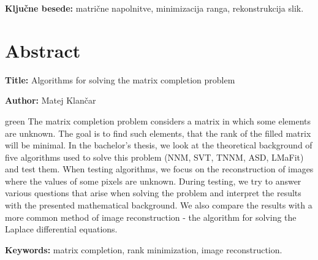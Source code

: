 \documentclass[a4paper,12pt,openright]{book}
\newcommand{\ttitleEn}{Algorithms for solving the matrix completion problem}
\newcommand{\tauthor}{Matej Klančar}
\newcommand{\tkeywords}{matrične napolnitve, minimizacija ranga, rekonstrukcija slik}
\newcommand{\tkeywordsEn}{matrix completion, rank minimization, image reconstruction}
\newcommand{\clearemptydoublepage}{\newpage{\pagestyle{empty}\cleardoublepage}}
\newcommand{\CG}[1]{\begin{color}{green}#1\end{color}}
\begin{document}
\bigskip

\noindent\textbf{Ključne besede:} \tkeywords.
\clearemptydoublepage

{}
\chapter*{Abstract}

\noindent\textbf{Title:} \ttitleEn
\bigskip

\noindent\textbf{Author:} \tauthor
\bigskip

\noindent \CG{
    The matrix completion problem considers a matrix in which some elements are unknown. The goal is to find such elements, that the rank of the filled matrix will be minimal. In the bachelor's thesis, we look at the theoretical background of five algorithms used to solve this problem (NNM, SVT, TNNM, ASD, LMaFit) and test them. When testing algorithms, we focus on the reconstruction of images where the values of some pixels are unknown. During testing, we try to answer various questions that arise when solving the problem and interpret the results with the presented mathematical background. We also compare the results with a more common method of image reconstruction - the algorithm for solving the Laplace differential equations.
}
\bigskip

\noindent\textbf{Keywords:} \tkeywordsEn.
\clearemptydoublepage

\mainmatter
\setcounter{page}{1}
\pagestyle{fancy}











\printbibliography
\end{document}

